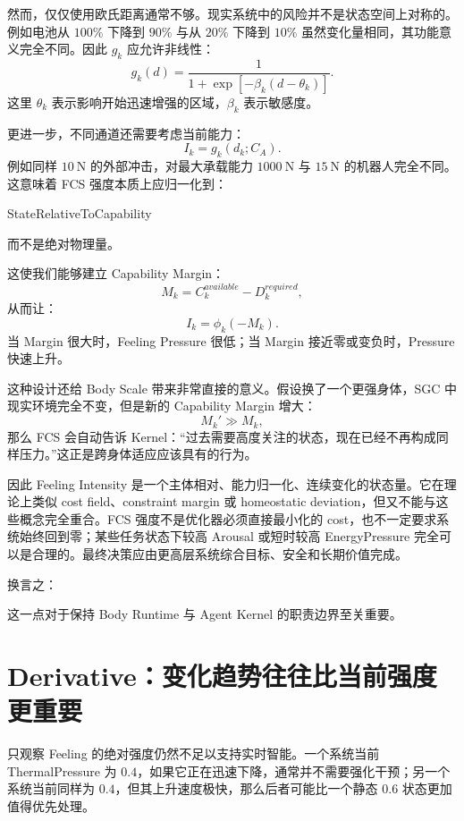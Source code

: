 然而，仅仅使用欧氏距离通常不够。现实系统中的风险并不是状态空间上对称的。例如电池从 $100\%$ 下降到 $90\%$ 与从 $20\%$ 下降到 $10\%$ 虽然变化量相同，其功能意义完全不同。因此 $g_k$ 应允许非线性：
\[
g_k(d)
=
\frac{1}
{1+\exp[-\beta_k(d-\theta_k)]}.
\]
这里 $\theta_k$ 表示影响开始迅速增强的区域，$\beta_k$ 表示敏感度。

更进一步，不同通道还需要考虑当前能力：
\[
I_k
=
g_k
(
d_k;
C_A
).
\]
例如同样 $10\mathrm{~N}$ 的外部冲击，对最大承载能力 $1000\mathrm{~N}$ 与 $15\mathrm{~N}$ 的机器人完全不同。这意味着 FCS 强度本质上应归一化到：
\begin{statementbox}
StateRelativeToCapability
\end{statementbox}
而不是绝对物理量。

这使我们能够建立 Capability Margin：
\[
M_k
=
C_k^{available}
-
D_k^{required},
\]
从而让：
\[
I_k
=
\phi_k(-M_k).
\]
当 Margin 很大时，Feeling Pressure 很低；当 Margin 接近零或变负时，Pressure 快速上升。

这种设计还给 Body Scale 带来非常直接的意义。假设换了一个更强身体，SGC 中现实环境完全不变，但是新的 Capability Margin 增大：
\[
M_k'\gg M_k,
\]
那么 FCS 会自动告诉 Kernel：“过去需要高度关注的状态，现在已经不再构成同样压力。”这正是跨身体适应应该具有的行为。

因此 Feeling Intensity 是一个主体相对、能力归一化、连续变化的状态量。它在理论上类似 cost field、constraint margin 或 homeostatic deviation，但又不能与这些概念完全重合。FCS 强度不是优化器必须直接最小化的 cost，也不一定要求系统始终回到零；某些任务状态下较高 Arousal 或短时较高 EnergyPressure 完全可以是合理的。最终决策应由更高层系统综合目标、安全和长期价值完成。

换言之：
\begin{statementbox}
\centering
{}
\end{statementbox}
这一点对于保持 Body Runtime 与 Agent Kernel 的职责边界至关重要。

\section{Derivative：变化趋势往往比当前强度更重要}

只观察 Feeling 的绝对强度仍然不足以支持实时智能。一个系统当前 ThermalPressure 为 $0.4$，如果它正在迅速下降，通常并不需要强化干预；另一个系统当前同样为 $0.4$，但其上升速度极快，那么后者可能比一个静态 $0.6$ 状态更加值得优先处理。


